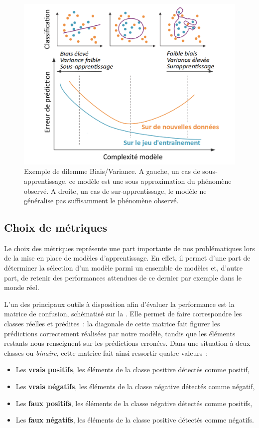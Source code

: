 \begin{figure}[H]
    \centering
    \includegraphics[width=0.8\linewidth]{contents/chapter_3/resources/example_underfit_overfit.pdf}
    \caption{Exemple de dilemme Biais/Variance. A gauche, un cas de sous-apprentissage, ce modèle est une sous approximation du phénomène observé. A droite, un cas de sur-apprentissage, le modèle ne généralise pas suffisamment le phénomène observé.}
    \label{fig:example_underfit_overfit}
\end{figure}

\subsection{Choix de métriques}
\label{subsec:metrics}
Le choix des métriques représente une part importante de nos problématiques lors de la mise en place de modèles d’apprentissage. En effet, il permet d'une part de déterminer la sélection d'un modèle parmi un ensemble de modèles et, d'autre part, de retenir des performances attendues de ce dernier par exemple dans le monde réel.\par

L’un des principaux outils à disposition afin d'évaluer la performance est la matrice de confusion, schématisé sur la . Elle permet de faire correspondre les classes réelles et prédites~: la diagonale de cette matrice fait figurer les prédictions correctement réalisées par notre modèle, tandis que les éléments restants nous renseignent sur les prédictions erronées. Dans une situation à deux classes ou \textit{binaire}, cette matrice fait ainsi ressortir quatre valeurs~:
\begin{itemize}
	\item Les \textbf{vrais positifs}, les éléments de la classe positive détectés comme positif,
	\item Les \textbf{vrais négatifs}, les éléments de la classe négative détectés comme négatif,
	\item Les \textbf{faux positifs}, les éléments de la classe négative détectés comme positifs,
	\item Les \textbf{faux négatifs}, les éléments de la classe positive détectés comme négatifs.
\end{itemize}\par

